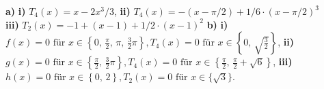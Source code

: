 {
{\textbf{a)}\textbf{ i)}} $T_4(x)=x-2x^3/3$, {\textbf{ ii)}} $T_4(x)=-(x-\pi/2)+1/6\cdot (x-\pi/2)^3$\\
{\textbf{ iii)}} $T_2(x)=-1+(x-1)+1/2\cdot (x-1)^2$
{\textbf{b)}} {\textbf{i)}} $f(x)=0 \text{ f\"ur } x\in\left\{0,\,\frac \pi 2,\, \pi,\, \frac 32 \pi\right\}, T_4(x)=0\text{ f\"ur } x\in \left\{0,\, \sqrt{\frac 32}\right\}$,
{\textbf{ii)}} $g(x)=0 \text{ f\"ur } x\in\left\{\frac \pi 2,\, \frac 32 \pi\right\},
T_4(x)=0\text{ f\"ur } x\in \left\{\frac \pi 2,\, \frac \pi 2 + \sqrt 6\right\}$,
{\textbf{iii)}} $h(x)=0 \text{ f\"ur } x\in\left\{0,\, 2\right\},
T_2(x)=0\text{ f\"ur } x\in \{\sqrt 3\}$.
}
